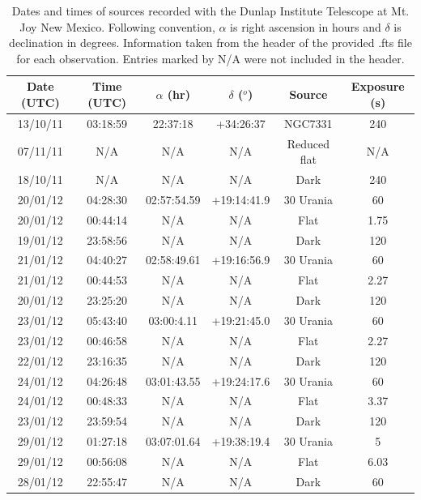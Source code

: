 \documentclass[a4paper,12pt]{article}
\begin{document}
\begin{table}[!htbp]
  \centering
  \begin{tabular}{c||c||c||c||c||c}
   Date (UTC) & Time (UTC) & $\alpha$ (hr) & $\delta$ ($^o$) & Source & Exposure (s)\\
   \hline
   \hline
   13/10/11 & 03:18:59 & 22:37:18 & +34:26:37 & NGC7331 & 240\\
   07/11/11 & N/A & N/A & N/A & Reduced flat & N/A \\
   18/10/11 & N/A & N/A & N/A & Dark & 240\\
   \hline
   20/01/12 & 04:28:30 & 02:57:54.59 & +19:14:41.9 & 30 Urania & 60\\
   20/01/12 & 00:44:14 & N/A & N/A & Flat & 1.75\\
   19/01/12 & 23:58:56 & N/A & N/A & Dark & 120\\
   \hline
   21/01/12 & 04:40:27 & 02:58:49.61 & +19:16:56.9 & 30 Urania & 60\\
   21/01/12 & 00:44:53 & N/A & N/A & Flat & 2.27\\
   20/01/12 & 23:25:20 & N/A & N/A & Dark & 120\\
   \hline
   23/01/12 & 05:43:40 & 03:00:4.11 & +19:21:45.0 & 30 Urania & 60\\
   23/01/12 & 00:46:58 & N/A & N/A & Flat & 2.27\\
   22/01/12 & 23:16:35 & N/A & N/A & Dark & 120\\
   \hline
   24/01/12 & 04:26:48 & 03:01:43.55 & +19:24:17.6 & 30 Urania & 60\\
   24/01/12 & 00:48:33 & N/A & N/A & Flat & 3.37\\
   23/01/12 & 23:59:54 & N/A & N/A & Dark & 120\\
   \hline
   29/01/12 & 01:27:18 & 03:07:01.64 & +19:38:19.4 & 30 Urania & 5\\
   29/01/12 & 00:56:08 & N/A & N/A & Flat & 6.03\\
   28/01/12 & 22:55:47 & N/A & N/A & Dark & 60\\
   \end{tabular}
    \caption{Dates and times of sources recorded with the Dunlap Institute Telescope at Mt. Joy New Mexico. Following convention, $\alpha$ is right ascension in hours and $\delta$ is declination in degrees. Information taken from the header of the provided .fts file for each observation. Entries marked by N/A were not included in the header.}
    \label{tab:datatable}
\end{table}
\end{document}

